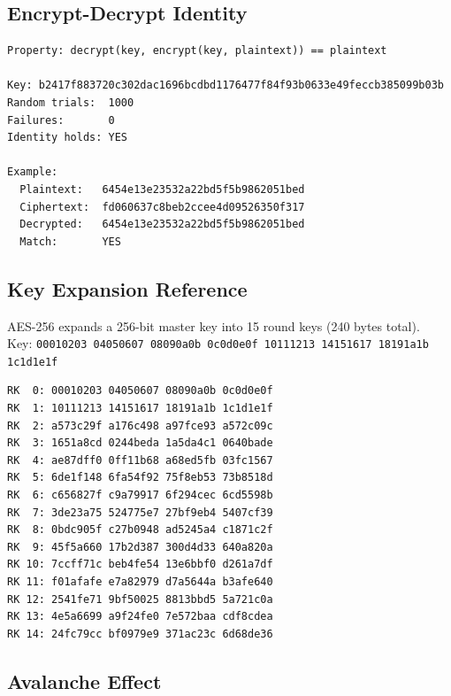 \documentclass[11pt,a4paper]{article}
\begin{document}
\vspace{-1em}
\begin{center}
\end{center}

\subsection{Encrypt-Decrypt Identity}

\begin{lstlisting}[style=terminal]
Property: decrypt(key, encrypt(key, plaintext)) == plaintext

Key: b2417f883720c302dac1696bcdbd1176477f84f93b0633e49feccb385099b03b
Random trials:  1000
Failures:       0
Identity holds: YES

Example:
  Plaintext:   6454e13e23532a22bd5f5b9862051bed
  Ciphertext:  fd060637c8beb2ccee4d09526350f317
  Decrypted:   6454e13e23532a22bd5f5b9862051bed
  Match:       YES
\end{lstlisting}

\subsection{Key Expansion Reference}

AES-256 expands a 256-bit master key into 15 round keys (240 bytes total).\\
Key: \texttt{00010203 04050607 08090a0b 0c0d0e0f 10111213 14151617 18191a1b 1c1d1e1f}

\begin{lstlisting}[style=terminal]
RK  0: 00010203 04050607 08090a0b 0c0d0e0f
RK  1: 10111213 14151617 18191a1b 1c1d1e1f
RK  2: a573c29f a176c498 a97fce93 a572c09c
RK  3: 1651a8cd 0244beda 1a5da4c1 0640bade
RK  4: ae87dff0 0ff11b68 a68ed5fb 03fc1567
RK  5: 6de1f148 6fa54f92 75f8eb53 73b8518d
RK  6: c656827f c9a79917 6f294cec 6cd5598b
RK  7: 3de23a75 524775e7 27bf9eb4 5407cf39
RK  8: 0bdc905f c27b0948 ad5245a4 c1871c2f
RK  9: 45f5a660 17b2d387 300d4d33 640a820a
RK 10: 7ccff71c beb4fe54 13e6bbf0 d261a7df
RK 11: f01afafe e7a82979 d7a5644a b3afe640
RK 12: 2541fe71 9bf50025 8813bbd5 5a721c0a
RK 13: 4e5a6699 a9f24fe0 7e572baa cdf8cdea
RK 14: 24fc79cc bf0979e9 371ac23c 6d68de36
\end{lstlisting}

\subsection{Avalanche Effect}
\end{document}
